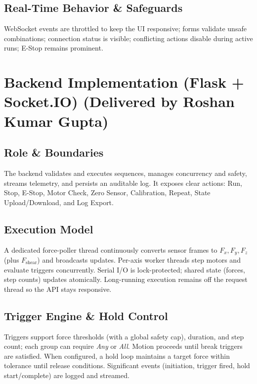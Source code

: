 \documentclass[
    twocolumn,
    fontsize = 10pt,
    parskip = half+,
    headings = small,
    headwidth = text,
    footwidth = text,
]{scrartcl}
\begin{document}
\subsection{Real-Time Behavior \& Safeguards}
WebSocket events are throttled to keep the UI responsive; forms validate unsafe combinations; connection status is visible; conflicting actions disable during active runs; E-Stop remains prominent.


\section{Backend Implementation (Flask + Socket.IO) \textnormal{(Delivered by Roshan Kumar Gupta)}}
\label{sec:backend}

\subsection{Role \& Boundaries}
The backend validates and executes sequences, manages concurrency and safety, streams telemetry, and persists an auditable log. It exposes clear actions: Run, Stop, E-Stop, Motor Check, Zero Sensor, Calibration, Repeat, State Upload/Download, and Log Export.

\subsection{Execution Model}
A dedicated force-poller thread continuously converts sensor frames to $F_x, F_y, F_z$ (plus $F_{\text{shear}}$) and broadcasts updates. Per-axis worker threads step motors and evaluate triggers concurrently. Serial I/O is lock-protected; shared state (forces, step counts) updates atomically. Long-running execution remains off the request thread so the API stays responsive.

\subsection{Trigger Engine \& Hold Control}
Triggers support force thresholds (with a global safety cap), duration, and step count; each group can require \emph{Any} or \emph{All}. Motion proceeds until break triggers are satisfied. When configured, a hold loop maintains a target force within tolerance until release conditions. Significant events (initiation, trigger fired, hold start/complete) are logged and streamed.
\end{document}
